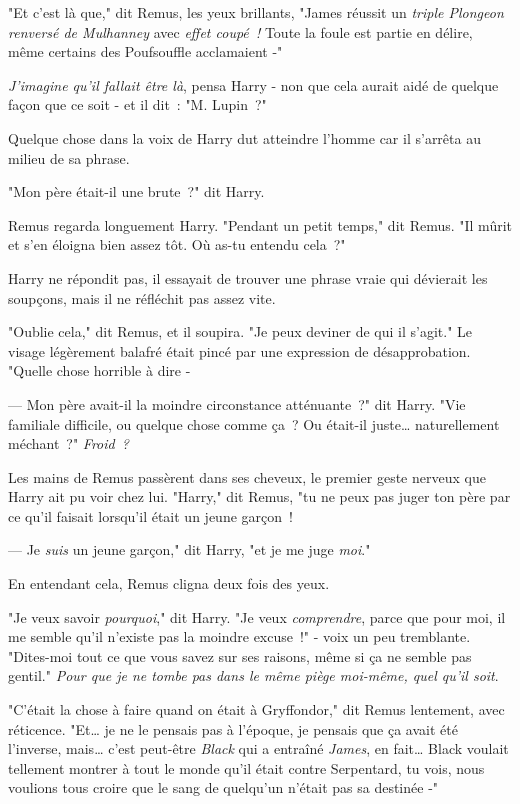 "Et c'est là que," dit Remus, les yeux brillants, "James réussit un \emph{triple Plongeon renversé de Mulhanney} avec \emph{effet coupé~!} Toute la foule est partie en délire, même certains des Poufsouffle acclamaient -"

\emph{J'imagine qu'il fallait être là}, pensa Harry - non que cela aurait aidé de quelque façon que ce soit - et il dit~: "M. Lupin~?"

Quelque chose dans la voix de Harry dut atteindre l'homme car il s'arrêta au milieu de sa phrase.

"Mon père était-il une brute~?" dit Harry.

Remus regarda longuement Harry. "Pendant un petit temps," dit Remus. "Il mûrit et s'en éloigna bien assez tôt. Où as-tu entendu cela~?"

Harry ne répondit pas, il essayait de trouver une phrase vraie qui dévierait les soupçons, mais il ne réfléchit pas assez vite.

"Oublie cela," dit Remus, et il soupira. "Je peux deviner de qui il s'agit." Le visage légèrement balafré était pincé par une expression de désapprobation. "Quelle chose horrible à dire -

--- Mon père avait-il la moindre circonstance atténuante~?" dit Harry. "Vie familiale difficile, ou quelque chose comme ça~? Ou était-il juste… naturellement méchant~?" \emph{Froid~?}

Les mains de Remus passèrent dans ses cheveux, le premier geste nerveux que Harry ait pu voir chez lui. "Harry," dit Remus, "tu ne peux pas juger ton père par ce qu'il faisait lorsqu'il était un jeune garçon~!

--- Je \emph{suis} un jeune garçon," dit Harry, "et je me juge \emph{moi}."

En entendant cela, Remus cligna deux fois des yeux.

"Je veux savoir \emph{pourquoi}," dit Harry. "Je veux \emph{comprendre}, parce que pour moi, il me semble qu'il n'existe pas la moindre excuse~!" - voix un peu tremblante. "Dites-moi tout ce que vous savez sur ses raisons, même si ça ne semble pas gentil." \emph{Pour que je ne tombe pas dans le même piège moi-même, quel qu'il soit}.

"C'était la chose à faire quand on était à Gryffondor," dit Remus lentement, avec réticence. "Et… je ne le pensais pas à l'époque, je pensais que ça avait été l'inverse, mais… c'est peut-être \emph{Black} qui a entraîné \emph{James}, en fait… Black voulait tellement montrer à tout le monde qu'il était contre Serpentard, tu vois, nous voulions tous croire que le sang de quelqu'un n'était pas sa destinée -"

